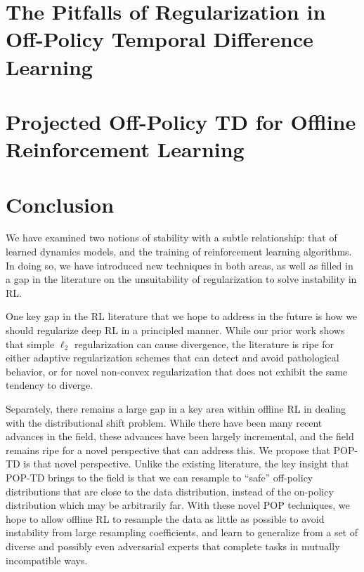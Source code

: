 \documentclass[12pt]{cmuthesis}
\begin{document}
\chapter[The Pitfalls of Regularization in Off-Policy TD]{The Pitfalls of Regularization in Off-Policy Temporal Difference Learning}



\chapter{Projected Off-Policy TD for Offline Reinforcement Learning}



\backmatter{}
\chapter{Conclusion}

We have examined two notions of stability with a subtle relationship: that of learned dynamics models, and the training of reinforcement learning algorithms. In doing so, we have introduced new techniques in both areas, as well as filled in a gap in the literature on the unsuitability of regularization to solve instability in RL.

One key gap in the RL literature that we hope to address in the future is how we should regularize deep RL in a principled manner. While our prior work shows that simple $\ell_2$ regularization can cause divergence, the literature is ripe for either adaptive regularization schemes that can detect and avoid pathological behavior, or for novel non-convex regularization that does not exhibit the same tendency to diverge.

Separately, there remains a large gap in a key area within offline RL in dealing with the distributional shift problem. While there have been many recent advances in the field, these advances have been largely incremental, and the field remains ripe for a novel perspective that can address this. We propose that POP-TD is that novel perspective. Unlike the existing literature, the key insight that POP-TD brings to the field is that we can resample to ``safe'' off-policy distributions that are close to the data distribution, instead of the on-policy distribution which may be arbitrarily far. With these novel POP techniques, we hope to allow offline RL to resample the data as little as possible to avoid instability from large resampling coefficients, and learn to generalize from a set of diverse and possibly even adversarial experts that complete tasks in mutually incompatible ways.

\appendix


\printbibliography{}
\end{document}
